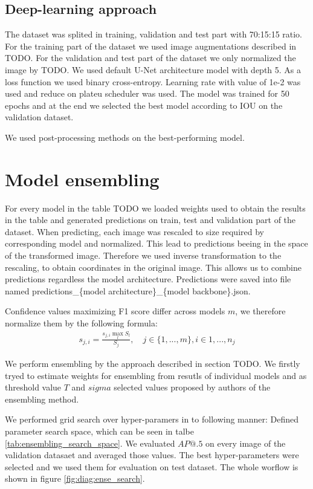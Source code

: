 \subsection{Deep-learning approach}
The dataset was splited in training, validation and test part with 70:15:15 ratio. For the training part of the dataset we used image augmentations described in TODO. For the validation and test part of the dataset we only normalized the image by TODO. 
We used default U-Net architecture model with depth 5. As a loss function we used binary cross-entropy. Learning rate with value of 1e-2 was used and reduce on plateu scheduler was used. The model was trained for 50 epochs and at the end we selected the best model according to IOU on the validation dataset.

We used post-processing methods on the best-performing model. 



\section{Model ensembling}

For every model in the table TODO we loaded weights used to obtain the results in the table and generated predictions on train, test and validation part of the dataset. When predicting, each image was rescaled to size required by corresponding model and normalized. This lead to predictions beeing in the space of the transformed image. Therefore we used inverse transformation to the rescaling, to obtain coordinates in the original image. This allows us to combine predictions regardless the model architecture.
Predictions were saved into file named predictions\_\{model architecture\}\_\{model backbone\}.json.

Confidence values maximizing F1 score differ across models $m$, we therefore normalize them by the following formula:
\begin{align}
    s_{j,i} = \frac{s_{j,i} \max_l S_l}{  S_j}, \quad j \in \{ 1,...,m\}, i \in {1,...,n_j}
\end{align}

We perform ensembling by the approach described in section TODO. We firstly tryed to estimate weights for ensembling from resutls of individual models and as threshold value $T$ and $sigma$ selected values proposed by authors of the ensembling method.

We performed grid search over hyper-paramers in to following manner: Defined parameter search space, which can be seen in talbe \ref{tab:ensembling_search_space}. We evaluated $AP@.5$ on every image of the validation datasaet and averaged those values. The best hyper-parameters were selected and we used them for evaluation on test dataset. The whole worflow is shown in figure \ref{fig:diag:ense_search}.

